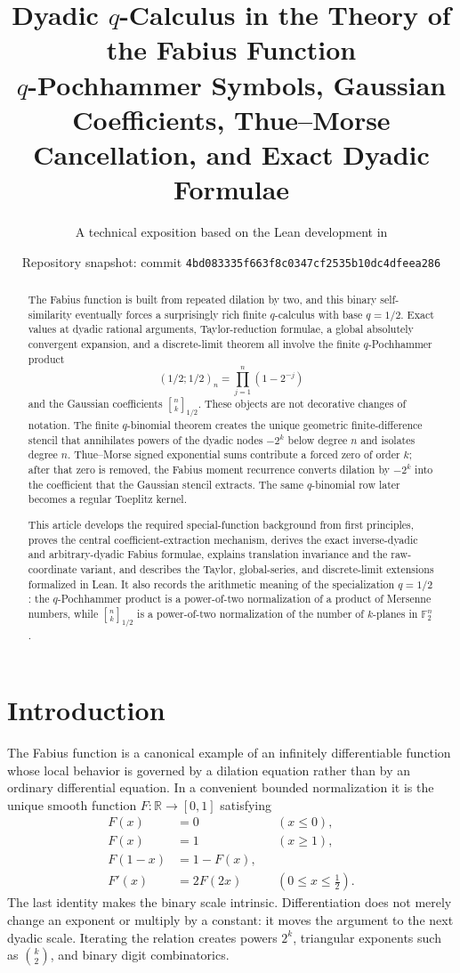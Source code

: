 \documentclass[11pt]{article}
\title{\bfseries Dyadic $q$-Calculus in the Theory of the Fabius Function\\[0.35em]
\large $q$-Pochhammer Symbols, Gaussian Coefficients, Thue--Morse Cancellation, and Exact Dyadic Formulae}
\author{A technical exposition based on the Lean development in \repo}
\date{Repository snapshot: commit \texttt{4bd083335f663f8c0347cf2535b10dc4dfeea286}}
\theoremstyle{definition}
\newcommand{\R}{\mathbb{R}}
\newcommand{\Fabius}{F}
\newcommand{\qpoch}[3]{\left(#1;#2\right)_{#3}}
\newcommand{\Qbin}[3]{\genfrac{[}{]}{0pt}{}{#1}{#2}_{#3}}
\begin{document}
\maketitle

\begin{abstract}
The Fabius function is built from repeated dilation by two, and this binary self-similarity eventually forces a surprisingly rich finite $q$-calculus with base $q=1/2$.  Exact values at dyadic rational arguments, Taylor-reduction formulae, a global absolutely convergent expansion, and a discrete-limit theorem all involve the finite $q$-Pochhammer product
\[
  \qpoch{1/2}{1/2}{n}=\prod_{j=1}^{n}(1-2^{-j})
\]
and the Gaussian coefficients $\Qbin{n}{k}{1/2}$.  These objects are not decorative changes of notation.  The finite $q$-binomial theorem creates the unique geometric finite-difference stencil that annihilates powers of the dyadic nodes $-2^k$ below degree $n$ and isolates degree $n$.  Thue--Morse signed exponential sums contribute a forced zero of order $k$; after that zero is removed, the Fabius moment recurrence converts dilation by $-2^k$ into the coefficient that the Gaussian stencil extracts.  The same $q$-binomial row later becomes a regular Toeplitz kernel.

This article develops the required special-function background from first principles, proves the central coefficient-extraction mechanism, derives the exact inverse-dyadic and arbitrary-dyadic Fabius formulae, explains translation invariance and the raw-coordinate variant, and describes the Taylor, global-series, and discrete-limit extensions formalized in Lean.  It also records the arithmetic meaning of the specialization $q=1/2$: the $q$-Pochhammer product is a power-of-two normalization of a product of Mersenne numbers, while $\Qbin{n}{k}{1/2}$ is a power-of-two normalization of the number of $k$-planes in $\mathbb F_2^n$.
\end{abstract}

\tableofcontents
\newpage

\section{Introduction}

The Fabius function is a canonical example of an infinitely differentiable function whose local behavior is governed by a dilation equation rather than by an ordinary differential equation.  In a convenient bounded normalization it is the unique smooth function $\Fabius:\R\to[0,1]$ satisfying
\begin{align}
  \Fabius(x)&=0 &&(x\le 0), \\
  \Fabius(x)&=1 &&(x\ge 1), \\
  \Fabius(1-x)&=1-\Fabius(x), \\
  \Fabius'(x)&=2\Fabius(2x) &&(0\le x\le \tfrac12).
  \label{eq:fabius-characterization}
\end{align}
The last identity makes the binary scale intrinsic.  Differentiation does not merely change an exponent or multiply by a constant: it moves the argument to the next dyadic scale.  Iterating the relation creates powers $2^k$, triangular exponents such as $\binom{k}{2}$, and binary digit combinatorics.
\end{document}
